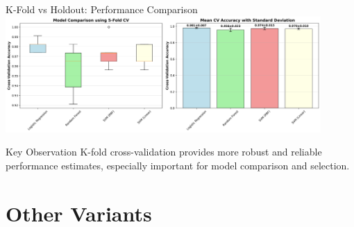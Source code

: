 \documentclass[8pt,aspectratio=1610]{beamer}
\begin{document}
\begin{frame}{K-Fold vs Holdout: Performance Comparison}
\centering
\includegraphics[width=0.9\textwidth]{../figures/model_comparison_cv.png}

\vspace{0.3cm}

\begin{alertblock}{Key Observation}
K-fold cross-validation provides more robust and reliable performance estimates, especially important for model comparison and selection.
\end{alertblock}
\end{frame}


\section{Other Variants}
\end{document}
